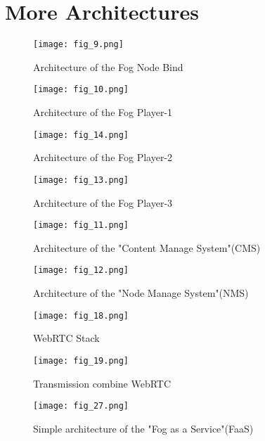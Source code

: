 \chapter{More Architectures}
\label{chap:appB}
\begin{figure}[htbp]
\centering
	  \texttt{[image: fig\_9.png]}
    \caption{Architecture of the Fog Node Bind}
 \label{fig_9}
\end{figure}

\begin{figure}[htbp]
\centering
	  \texttt{[image: fig\_10.png]}
    \caption{Architecture of the Fog Player-1}
 \label{fig_10}
\end{figure}

\begin{figure}[htbp]
\centering
	  \texttt{[image: fig\_14.png]}
    \caption{Architecture of the Fog Player-2}
 \label{fig_14}
\end{figure}

\begin{figure}[htbp]
\centering
	  \texttt{[image: fig\_13.png]}
    \caption{Architecture of the Fog Player-3}
 \label{fig_13}
\end{figure}
\begin{figure}[htbp]
\centering
	  \texttt{[image: fig\_11.png]}
    \caption{Architecture of the "Content Manage System"(CMS)}
 \label{fig_11}
\end{figure}
\begin{figure}[htbp]
\centering
	  \texttt{[image: fig\_12.png]}
    \caption{Architecture of the "Node Manage System"(NMS)}
 \label{fig_12}
\end{figure}
\begin{figure}[htbp]
\centering
	  \texttt{[image: fig\_18.png]}
    \caption{WebRTC Stack}
 \label{fig_18}
\end{figure}

\begin{figure}[htbp]
\centering
	  \texttt{[image: fig\_19.png]}
    \caption{Transmission combine WebRTC}
 \label{fig_19}
\end{figure}

\begin{figure}[htbp]
\centering
	  \texttt{[image: fig\_27.png]}
    \caption{Simple architecture of the "Fog as a Service"(FaaS)}
 \label{fig_27}
\end{figure}
